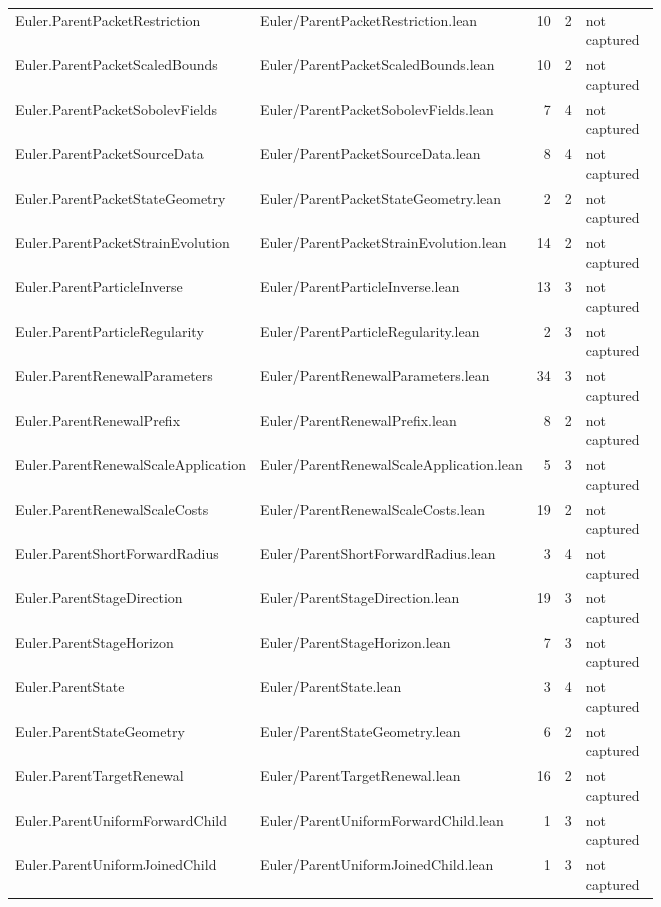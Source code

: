 \documentclass[10pt]{article}
\begin{document}
\begin{longtable}{p{0.28\linewidth}p{0.27\linewidth}r r p{0.20\linewidth}}
Euler.ParentPacketRestriction & Euler/ParentPacketRestriction.lean & 10 & 2 & not captured\\
Euler.ParentPacketScaledBounds & Euler/ParentPacketScaledBounds.lean & 10 & 2 & not captured\\
Euler.ParentPacketSobolevFields & Euler/ParentPacketSobolevFields.lean & 7 & 4 & not captured\\
Euler.ParentPacketSourceData & Euler/ParentPacketSourceData.lean & 8 & 4 & not captured\\
Euler.ParentPacketStateGeometry & Euler/ParentPacketStateGeometry.lean & 2 & 2 & not captured\\
Euler.ParentPacketStrainEvolution & Euler/ParentPacketStrainEvolution.lean & 14 & 2 & not captured\\
Euler.ParentParticleInverse & Euler/ParentParticleInverse.lean & 13 & 3 & not captured\\
Euler.ParentParticleRegularity & Euler/ParentParticleRegularity.lean & 2 & 3 & not captured\\
Euler.ParentRenewalParameters & Euler/ParentRenewalParameters.lean & 34 & 3 & not captured\\
Euler.ParentRenewalPrefix & Euler/ParentRenewalPrefix.lean & 8 & 2 & not captured\\
Euler.ParentRenewalScaleApplication & Euler/ParentRenewalScaleApplication.lean & 5 & 3 & not captured\\
Euler.ParentRenewalScaleCosts & Euler/ParentRenewalScaleCosts.lean & 19 & 2 & not captured\\
Euler.ParentShortForwardRadius & Euler/ParentShortForwardRadius.lean & 3 & 4 & not captured\\
Euler.ParentStageDirection & Euler/ParentStageDirection.lean & 19 & 3 & not captured\\
Euler.ParentStageHorizon & Euler/ParentStageHorizon.lean & 7 & 3 & not captured\\
Euler.ParentState & Euler/ParentState.lean & 3 & 4 & not captured\\
Euler.ParentStateGeometry & Euler/ParentStateGeometry.lean & 6 & 2 & not captured\\
Euler.ParentTargetRenewal & Euler/ParentTargetRenewal.lean & 16 & 2 & not captured\\
Euler.ParentUniformForwardChild & Euler/ParentUniformForwardChild.lean & 1 & 3 & not captured\\
Euler.ParentUniformJoinedChild & Euler/ParentUniformJoinedChild.lean & 1 & 3 & not captured\\

\end{longtable}
\end{document}
